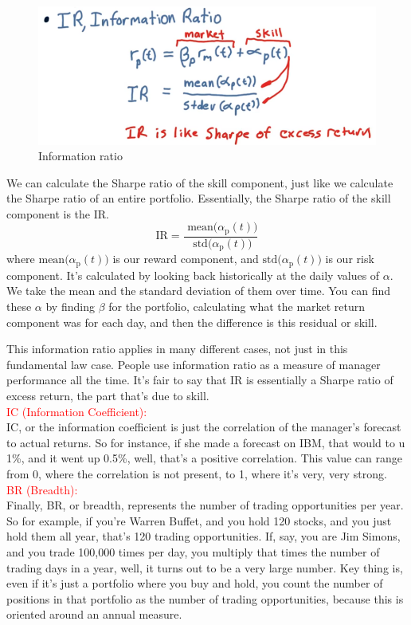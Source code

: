 \documentclass[12pt]{article}
\begin{document}
\begin{figure}[!ht]
\centering
\includegraphics[scale=0.4]{fig/fig65}
\caption{Information ratio}
\end{figure}

We can calculate the Sharpe ratio of the skill component, just like we calculate the Sharpe ratio of an entire portfolio. Essentially, the Sharpe ratio of the skill component is the IR. 
\begin{equation}
\text{IR} = \frac{ \text{ mean(}\alpha_{\text{p} }(t)) }{ \text{ std(}\alpha_{\text{p} }(t)) }
\end{equation}
where $\text{mean(}\alpha_{\text{p}}(t))$ is our reward component, and $\text{std(}\alpha_{\text{p}}(t))$ is our risk component. It's calculated by looking back historically at the daily values of $\alpha$. We take the mean and the standard deviation of them over time. You can find these $\alpha$ by finding $\beta$ for the portfolio, calculating what the market return component was for each day, and then the difference is this residual or skill. 

This information ratio applies in many different cases, not just in this fundamental law case. People use information ratio as a measure of manager performance all the time. It's fair to say that IR is essentially a Sharpe ratio of excess return, the part that's due to skill. \\[5pt]
\noindent
\textcolor{red}{IC (Information Coefficient):} \\
IC, or the information coefficient is just the correlation of the manager's forecast to actual returns. So for instance, if she made a forecast on IBM, that would to u 1\%, and it went up 0.5\%, well, that's a positive correlation. This value can range from 0, where the correlation is not present, to 1, where it's very, very strong. \\[5pt]
\noindent
\textcolor{red}{BR (Breadth):}\\
Finally, BR, or breadth, represents the number of trading opportunities per year. So for example, if you're Warren Buffet, and you hold 120 stocks, and you just hold them all year, that's 120 trading opportunities. If, say, you are Jim Simons, and you trade 100,000 times per day, you multiply that times the number of trading days in a year, well, it turns out to be a very large number. Key thing is, even if it's just a portfolio where you buy and hold, you count the number of positions in that portfolio as the number of trading opportunities, because this is oriented around an annual measure. 
\end{document}

